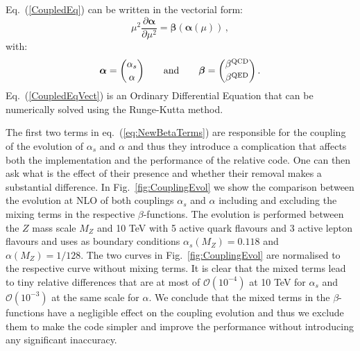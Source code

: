 Eq.~(\ref{CoupledEq}) can be written in the vectorial form:
\begin{equation}\label{CoupledEqVect}
\mu^2\frac{\partial {\bm \alpha}}{\partial \mu^2} = {\bm \beta}\left({\bm \alpha}(\mu)\right)\,,
\end{equation}
with:
\begin{equation}
  {\bm \alpha} = {\alpha_s \choose \alpha}\qquad\mbox{and}\qquad  {\bm \beta} = {\beta^{\rm QCD} \choose \beta^{\rm QED}}\,.
\end{equation}
Eq.~(\ref{CoupledEqVect}) is an Ordinary Differential Equation that
can be numerically solved using the Runge-Kutta method.

The first two terms in eq.~(\ref{eq:NewBetaTerms}) are responsible for
the coupling of the evolution of $\alpha_s$ and $\alpha$ and thus they
introduce a complication that affects both the implementation and the
performance of the relative code. One can then ask what is the effect
of their presence and whether their removal makes a substantial
difference. In Fig.~\ref{fig:CouplingEvol} we show the comparison
between the evolution at NLO of both couplings $\alpha_s$ and $\alpha$
including and excluding the mixing terms in the respective
$\beta$-functions. The evolution is performed between the $Z$ mass
scale $M_Z$ and 10 TeV with 5 active quark flavours and 3 active
lepton flavours and uses as boundary conditions
$\alpha_s(M_Z) = 0.118$ and $\alpha(M_Z) = 1/128$. The two curves in
Fig.~\ref{fig:CouplingEvol} are normalised to the respective curve
without mixing terms. It is clear that the mixed terms lead to tiny
relative differences that are at most of $\mathcal{O}(10^{-4})$ at 10
TeV for $\alpha_s$ and $\mathcal{O}(10^{-3})$ at the same scale for
$\alpha$. We conclude that the mixed terms in the $\beta$-functions
have a negligible effect on the coupling evolution and thus we exclude
them to make the code simpler and improve the performance without
introducing any significant inaccuracy.

